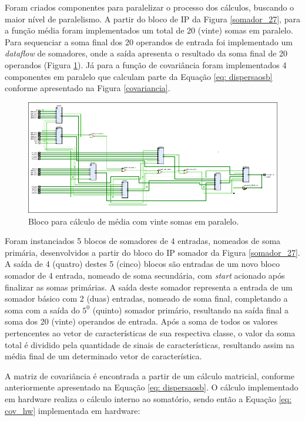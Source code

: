 Foram criados componentes para paralelizar o processo dos cálculos, buscando o maior nível de paralelismo. A partir do bloco de IP da Figura \ref{somador_27}, para a função média foram implementados um total de 20 (vinte) somas em paralelo. Para sequenciar a soma final dos 20 operandos de entrada foi implementado um \textit{dataflow} de somadores, onde a saída apresenta o resultado da soma final de 20 operandos (Figura \ref{somador}). Já para a função de covariância foram implementados 4 componentes em paralelo que calculam parte da Equação \ref{eq: dispersaosb} conforme apresentado na Figura \ref{covariancia}.

\begin{figure}[h]
	\centering
	\includegraphics[keepaspectratio=true,scale=0.55]{figuras/rtl_media.png}
	\caption{Bloco para cálculo de média com vinte somas em paralelo.}
	\label{somador}
\end{figure}

Foram instanciados 5 blocos de somadores de 4 entradas, nomeados de soma primária, desenvolvidos a partir do bloco do IP somador da Figura \ref{somador_27}. A saída de 4 (quatro) destes 5 (cinco) blocos são entradas de um novo bloco somador de 4 entrada, nomeado de soma secundária, com \textit{start} acionado após finalizar as somas primárias. A saída deste somador representa a entrada de um somador básico com 2 (duas) entradas, nomeado de soma final, completando a soma com a saída do $5^0$ (quinto) somador primário, resultando na saída final a soma dos 20 (vinte) operandos de entrada.
Após a soma de todos os valores pertencentes ao vetor de características de sua respectiva classe, o valor da soma total é dividido pela quantidade de sinais de características, resultando assim na média final de um determinado vetor de característica. 


A matriz de covariância é encontrada a partir de um cálculo matricial, conforme anteriormente apresentado na Equação \ref{eq: dispersaosb}. O cálculo implementado em hardware realiza o cálculo interno ao somatório, sendo então a Equação \ref{eq: cov_hw} implementada em hardware:

